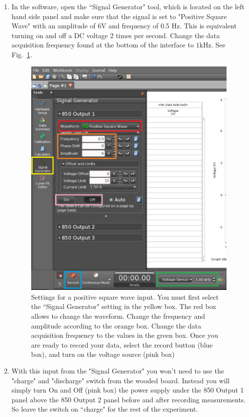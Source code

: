 \documentclass[12pt]{report}
\begin{document}
\begin{enumerate}
\item In the software, open the ``Signal Generator" tool, which is located on the left hand side panel and make sure that the signal is set to "Positive Square Wave" with an amplitude of 6V and frequency of 0.5 Hz. 
This is equivalent turning on and off a DC voltage 2 times per second. Change the data acquisition frequency found at the bottom of the interface to $1$kHz. See Fig.~\ref{Fig:lab2-interface-square-wave}.
\begin{figure}[h]
\centering
\includegraphics[scale=0.5]{lab2-interface-square-wave}
\caption{Settings for a positive square wave input. You must first select the ``Signal Generator" setting in the yellow box. 
The red box allows to change the waveform. Change the frequency and amplitude according to the orange box. 
Change the data acquisition frequency to the values in the green box. Once you are ready to record your data, select the record button (blue box), and turn on the voltage source (pink box)}
\label{Fig:lab2-interface-square-wave}
\end{figure}

\item With this input from the "Signal Generator" you won't need to use the "charge" and "discharge" switch from the wooded board. Instead you will simply turn On and Off (pink box) the power supply under the 850 Output 1 panel above the 850 Output 2 panel before and after recording measurements. So leave the switch on ``charge" for the rest of the experiment.


\end{enumerate}
\end{document}

